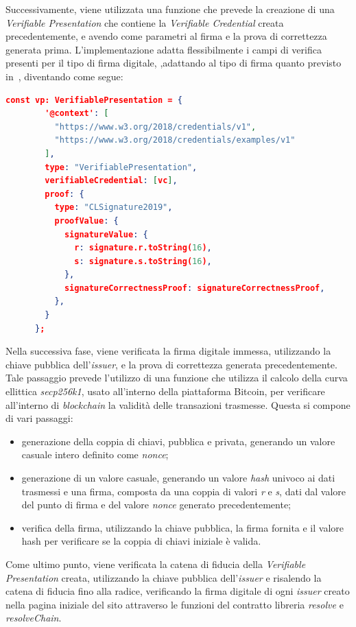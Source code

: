 Successivamente, viene utilizzata una funzione che prevede la creazione di una \textit{Verifiable Presentation} che contiene la \textit{Verifiable Credential} creata precedentemente,
e avendo come parametri al firma e la prova di correttezza generata prima. L'implementazione adatta flessibilmente i campi di verifica presenti per il tipo di firma digitale, 
,adattando al tipo di firma quanto previsto in~\cite{site:vpw3c}, diventando come segue:
\begin{lstlisting}[language=json]
    const vp: VerifiablePresentation = {
        '@context': [
          "https://www.w3.org/2018/credentials/v1",
          "https://www.w3.org/2018/credentials/examples/v1"
        ],
        type: "VerifiablePresentation",
        verifiableCredential: [vc],
        proof: {
          type: "CLSignature2019",
          proofValue: {
            signatureValue: {
              r: signature.r.toString(16),
              s: signature.s.toString(16),
            },
            signatureCorrectnessProof: signatureCorrectnessProof,
          },
        }
      };
\end{lstlisting}

Nella successiva fase, viene verificata la firma digitale immessa, utilizzando la chiave pubblica dell'\textit{issuer}, e la prova di correttezza generata precedentemente.
Tale passaggio prevede l'utilizzo di una funzione che utilizza il calcolo della curva ellittica \textit{secp256k1}, usato all'interno della piattaforma Bitcoin, per verificare all'interno di \textit{blockchain}
la validità delle transazioni trasmesse. Questa si compone di vari passaggi:
\begin{itemize}
    \item generazione della coppia di chiavi, pubblica e privata, generando un valore casuale intero definito come \textit{nonce};
    \item generazione di un valore casuale, generando un valore \textit{hash} univoco ai dati trasmessi e una firma, composta da una coppia di valori \textit{r} e \textit{s}, 
    dati dal valore del punto di firma e del valore \textit{nonce} generato precedentemente;
    \item verifica della firma, utilizzando la chiave pubblica, la firma fornita e il valore hash per verificare se la coppia di chiavi iniziale è valida.
\end{itemize}

Come ultimo punto, viene verificata la catena di fiducia della \textit{Verifiable Presentation} creata, utilizzando la chiave pubblica dell'\textit{issuer} e risalendo
la catena di fiducia fino alla radice, verificando la firma digitale di ogni \textit{issuer} creato nella pagina iniziale del sito attraverso le funzioni del contratto libreria
\textit{resolve} e \textit{resolveChain}.

